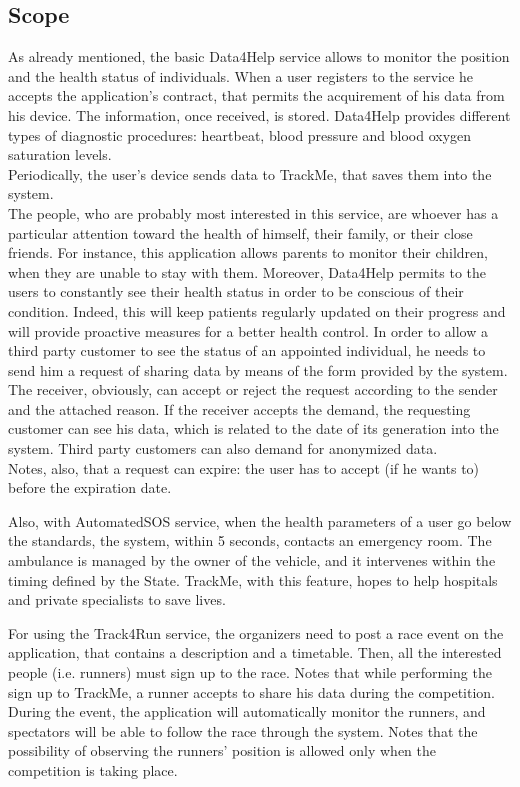 \subsection{Scope}
As already mentioned, the basic Data4Help service allows to monitor the position and the health status of individuals. When a user registers to the service he accepts the application's contract, that permits the acquirement of his data from his device. The information, once received, is stored. Data4Help provides different types of diagnostic procedures:  heartbeat, blood pressure and blood oxygen saturation levels.\\ 
Periodically, the user's device sends data to TrackMe, that saves them into the system. \\ 
The people, who are probably most interested in this service, are whoever has a particular attention toward the health of himself, their family, or their close friends.
For instance, this application allows parents to monitor their children, when they are unable to stay with them. 
Moreover, Data4Help permits to the users to constantly see their health status in order to be conscious of their condition. Indeed, this will keep patients regularly updated on their progress and will provide proactive measures for a better health control. 
In order to allow a third party customer to see the status of an appointed individual, he needs to send him a request of sharing data by means of the form provided by the system. 
The receiver, obviously, can accept or reject the request according to the sender and the attached reason. 
If the receiver accepts the demand, the requesting customer can see his data, which is related to the date of its generation into the system. Third party customers can also demand for anonymized data. \\ 
Notes, also, that a request can expire: the user has to accept (if he wants to) before the expiration date.

\par
Also, with AutomatedSOS service, when the health parameters of a user go below the standards, the system, within 5 seconds, contacts an emergency room.
The ambulance is managed by the owner of the vehicle, and it intervenes within the timing defined by the State.
TrackMe, with this feature, hopes to help hospitals and private specialists to save lives.

\par
For using the Track4Run service, the organizers need to post a race event on the application, that contains a description and a timetable. 
Then, all the interested people (i.e. runners) must sign up to the race.
Notes that while performing the sign up to TrackMe, a runner accepts to share his data during the competition. 
During the event, the application will automatically monitor the runners, and spectators will be able to follow the race through the system. 
Notes that the possibility of observing the runners' position is allowed only when the competition is taking place. \\

